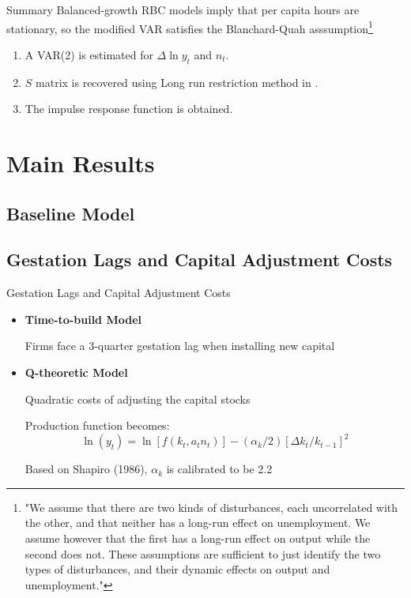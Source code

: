 \documentclass[10pt]{beamer}
\begin{document}
\begin{frame}{Summary}
    Balanced-growth RBC models imply that per capita hours are stationary, so the modified VAR satisfies the Blanchard-Quah asssumption\footnote{"We assume that there are two kinds of disturbances, each uncorrelated with the other, and that neither has a long-run effect on unemployment. We assume however that the first has a long-run effect on output while the second does not. These assumptions are sufficient to just identify the two types of disturbances, and their dynamic effects on output and unemployment."}
    \begin{enumerate}
        \item A VAR(2) is estimated for $\Delta \ln y_t$ and $n_t$.
        \item $S$ matrix is recovered using Long run restriction method in \cite{blanchard_quah_1988}.
        \item The impulse response function is obtained.
    \end{enumerate} 

\end{frame}


\section{Main Results}
\subsection{Baseline Model}

\subsection{Gestation Lags and Capital Adjustment Costs}

\begin{frame}{Gestation Lags and Capital Adjustment Costs}

    \begin{itemize}
        \item \textbf{Time-to-build Model}

              Firms face a 3-quarter gestation lag when installing new capital

        \item \textbf{Q-theoretic Model}

              Quadratic costs of adjusting the capital stocks

              Production function becomes: $$ \ln \left(y_t\right)= \ln \left[f\left(k_t, a_t
                      n_t\right)\right] -\left(\alpha_{k} / 2\right)\left[\Delta k_t /
                      k_{t-1}\right]^2 $$

              Based on Shapiro (1986), $\alpha_{k}$ is calibrated to be 2.2
    \end{itemize}

\end{frame}
\end{document}

